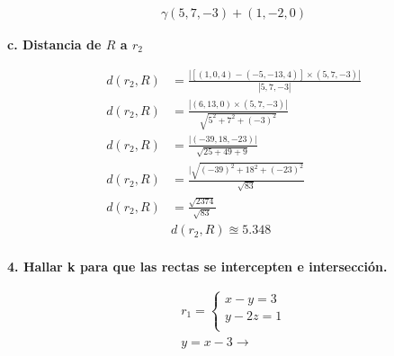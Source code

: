 \documentclass{article}
\begin{document}
\begin{align*}
    \boxed{\gamma (5,7,-3) + (1,-2,0)}
\end{align*}

\textbf{c. Distancia de \(R\) a \(r_2\)}

\begin{align*}
    d(r_2, R) & = \frac{|[(1,0,4) - (-5,-13,4)] \times (5,7,-3)|}{|5,7,-3|}\\
    d(r_2, R) & = \frac{|(6,13,0) \times (5,7,-3)|}{\sqrt{5^2 + 7^2 + (-3)^2}}\\
    d(r_2, R) & = \frac{|(-39,18,-23)|}{\sqrt{25 + 49 + 9}}\\
    d(r_2, R) & = \frac{|\sqrt{(-39)^2 + 18^2 + (-23)^2}}{\sqrt{83}}\\
    d(r_2, R) & = \frac{\sqrt{2374}}{\sqrt{83}}\\
    & \boxed{d(r_2, R) \approxeq 5.348}\\
\end{align*}

\textbf{4. Hallar k para que las rectas se intercepten e intersección.}

\begin{align*}
    r_1 =
    \begin{cases}
        x - y = 3\\
        y - 2z = 1\\
    \end{cases}\\
    y = x - 3 \rightarrow 
\end{align*}
\end{document}
